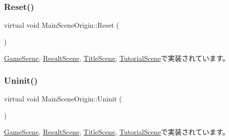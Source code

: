 \mbox{\label{class_main_scene_origin_a720d9daa0d45eff94ab55ef905b4aad8}} 
\subsubsection{\texorpdfstring{Reset()}{Reset()}}
{\footnotesize\ttfamily virtual void Main\+Scene\+Origin\+::\+Reset (\begin{DoxyParamCaption}{ }\end{DoxyParamCaption})\hspace{0.3cm}{\ttfamily [pure virtual]}}



\mbox{\hyperlink{class_game_scene_a0eb0aab5255435221c00ab010657904f}{Game\+Scene}}, \mbox{\hyperlink{class_result_scene_ae48bfcd86e35e46ffb7cde5c016a8b67}{Result\+Scene}}, \mbox{\hyperlink{class_title_scene_a8e2cbf00597aff2285f152eb0b8a4542}{Title\+Scene}}, \mbox{\hyperlink{class_tutorial_scene_afaf0a34700fdd92b1cbd975e74786161}{Tutorial\+Scene}}で実装されています。

\mbox{\label{class_main_scene_origin_a36b2f5278a3adf1187d7130c66a03c08}} 
\subsubsection{\texorpdfstring{Uninit()}{Uninit()}}
{\footnotesize\ttfamily virtual void Main\+Scene\+Origin\+::\+Uninit (\begin{DoxyParamCaption}{ }\end{DoxyParamCaption})\hspace{0.3cm}{\ttfamily [pure virtual]}}



\mbox{\hyperlink{class_game_scene_a5afeddb4ba8df90710c3b2a160406735}{Game\+Scene}}, \mbox{\hyperlink{class_result_scene_ace133e21ef473ffa06384403a88989ca}{Result\+Scene}}, \mbox{\hyperlink{class_title_scene_a92f6e51bff9fef849f4b05f95b2320c2}{Title\+Scene}}, \mbox{\hyperlink{class_tutorial_scene_a35100fe200483371154541bcce2476c2}{Tutorial\+Scene}}で実装されています。

\mbox{\label{class_main_scene_origin_aa4f54223932e0ca5f79ff11a7b87f843}} 

